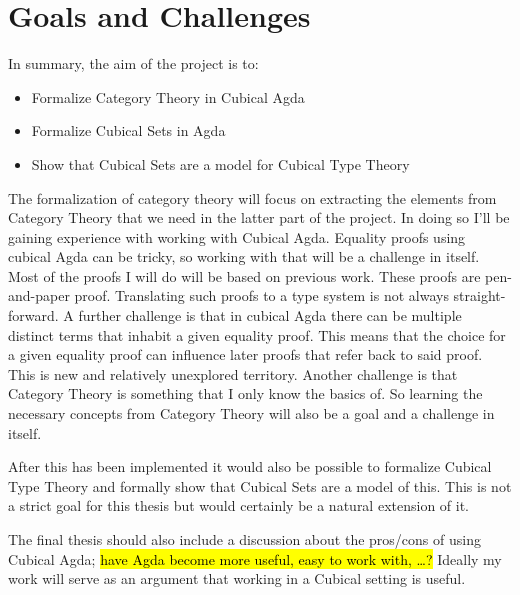 \documentclass{article}
\newcommand{\sectiondescription}[1]{\iffalse #1\fi}
\newcommand{\mycomment}[1]{\hl{#1}}
\begin{document}
\section{Goals and Challenges}
%
\sectiondescription{%
Describe your contribution with respect to concepts, theory and technical goals.
Ensure that the scientific and engineering challenges stand out so that the
reader can easily recognize that you are planning to solve an advanced problem.
}
%
In summary, the aim of the project is to:
%
\begin{itemize}
\item
Formalize Category Theory in Cubical Agda
\item
Formalize Cubical Sets in Agda
\item
Show that Cubical Sets are a model for Cubical Type Theory
\end{itemize}
%
The formalization of category theory will focus on extracting the elements from
Category Theory that we need in the latter part of the project. In doing so I'll
be gaining experience with working with Cubical Agda. Equality proofs using
cubical Agda can be tricky, so working with that will be a challenge in itself.
Most of the proofs I will do will be based on previous work. These proofs are
pen-and-paper proof. Translating such proofs to a type system is not always
straight-forward. A further challenge is that in cubical Agda there can be
multiple distinct terms that inhabit a given equality proof. This means that the
choice for a given equality proof can influence later proofs that refer back to
said proof. This is new and relatively unexplored territory. Another challenge
is that Category Theory is something that I only know the basics of. So learning
the necessary concepts from Category Theory will also be a goal and a challenge
in itself.

After this has been implemented it would also be possible to formalize Cubical
Type Theory and formally show that Cubical Sets are a model of this. This is not
a strict goal for this thesis but would certainly be a natural extension of it.

The final thesis should also include a discussion about the pros/cons of using
Cubical Agda; \mycomment{have Agda become more useful, easy to work with,
\ldots ? } Ideally my work will serve as an argument that working in a Cubical
setting is useful.
%
\end{document}
